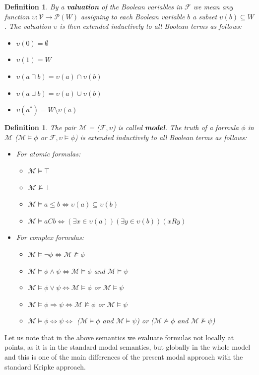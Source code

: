 \documentclass{article}
\newcommand\M{\mathcal{M}}
\newcommand\F{\mathcal{F}}
\newcommand\p{\mathcal{P}}
\newcommand\V{\mathcal{V}}
\newtheorem{defn}[theorem]{Definition}
\begin{document}
	\begin{defn}
		\label{valuation}
		By a \textbf{\textit{valuation}} of the Boolean variables in $\F$ we mean any function $\upsilon : \V \rightarrow \p(W)$ assigning to each Boolean variable $b$ a subset $\upsilon(b) \subseteq W$. The valuation $\upsilon$ is then extended inductively to all Boolean terms as follows:

		\begin{itemize}
			\item $\upsilon(0) = \emptyset$
			\item $\upsilon(1) = W$
			\item $\upsilon(a \sqcap b) = \upsilon(a) \cap \upsilon(b)$
			\item $\upsilon(a \sqcup b) = \upsilon(a) \cup \upsilon(b)$
			\item $\upsilon(a^*) = W \setminus \upsilon(a)$
		\end{itemize}
	\end{defn}

	\begin{defn}
		The pair $\M$ = ($\F, \upsilon$) is called \textbf{\textit{model}}. The truth of a formula $\phi$ in $\M$ ($\M \models \phi$ or $\F, \upsilon \models \phi$) is extended inductively to all Boolean terms as follows:
		\begin{itemize}
			\item For atomic formulas:
				\begin{itemize}
					\item $\M \models \top$
					\item $\M \not\models \bot$
					\item $\M \models a \leq b \iff \upsilon(a) \subseteq \upsilon(b)$
					\item $\M \models aCb \iff (\exists x \in \upsilon(a))(\exists y \in \upsilon(b))(xRy)$
				\end{itemize}
			\item For complex formulas:
				\begin{itemize}
					\item $\M \models \neg \phi \iff \M \not\models \phi$
					\item $\M \models \phi \land \psi \iff \M \models \phi$ and $\M \models \psi$
					\item $\M \models \phi \lor \psi \iff \M \models \phi$ or $\M \models \psi$
					\item $\M \models \phi \Rightarrow \psi \iff \M \not\models \phi$ or $\M \models \psi$
					\item $\M \models \phi \Leftrightarrow \psi \iff$ ($\M \models \phi$ and $\M \models \psi$) or ($\M \not\models \phi$ and $\M \not\models \psi$)
				\end{itemize}
		\end{itemize}
	\end{defn}
	\par
	Let us note that in the above semantics we evaluate formulas not locally at points, as it is in the standard modal semantics, but globally in the whole model and this is one of the main differences of the present modal approach with the standard Kripke approach.
\end{document}
